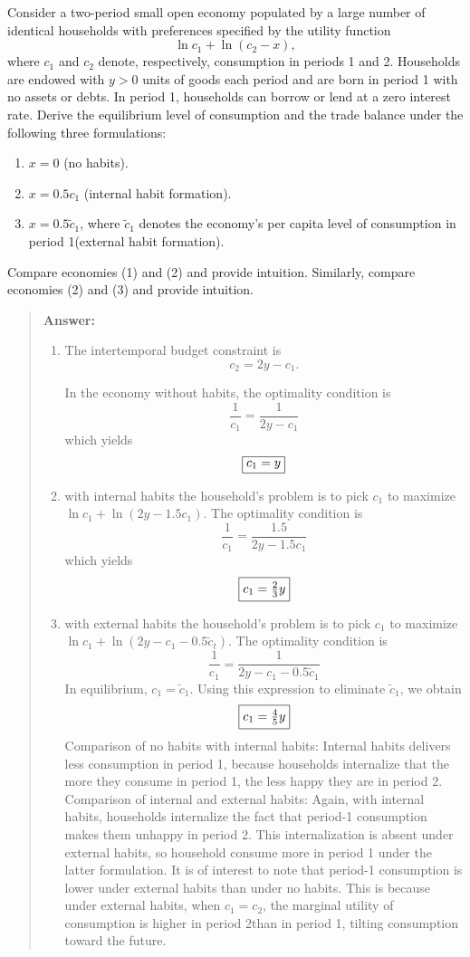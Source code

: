 \begin{exercise}
Consider a two-period small open economy populated by a large number of identical households with preferences specified by the utility function
\[\ln c_1 + \ln (c_2-x),\]
where $c_1$ and $c_2$ denote, respectively, consumption in periods 1 and 2. Households are endowed with $y>0$ units of goods each period and are born in period 1 with no assets or debts. In period 1, households can borrow or lend at a zero interest rate. Derive the equilibrium level of consumption and the trade balance under the following three formulations:
\begin{enumerate}
\item $x =0$ (no habits).
\item $x=0.5c_1$ (internal habit formation).
\item $x = 0.5\tilde{c}_1$, where $\tilde{c}_1$
denotes  the economy's per capita level of consumption  in period 1(external habit formation). 
\end{enumerate}
Compare economies (1) and (2) and provide intuition. Similarly,  compare economies (2) and (3) and provide intuition. 

\begin{quote}
{\bf Answer:}
\begin{enumerate}
\item 

 The intertemporal budget constraint is 
\[c_2 = 2y-c_1.\]


In the economy without habits, the optimality condition is 
\[
\frac 1 {c_1} = \frac 1 {2y-c_1}
\]
which yields
\[
\fbox{$c_1 = y$}
\]
\item with internal habits the household's problem is to pick $c_1$ to maximize 
$\ln c_1 + \ln (2y-1.5c_1)$. The optimality condition is
\[
\frac 1 {c_1} = \frac {1.5} {2y-1.5c_1}
\]
which yields
\[
\fbox{$c_1 = \frac 23y$}
\]
\item with external habits the household's problem is to pick $c_1$ to maximize 
$\ln c_1 + \ln (2y-c_1-0.5 \tilde{c}_t)$. The optimality condition is
\[
\frac 1 {c_1} = \frac {1} {2y-c_1-0.5\tilde{c}_1}
\]
In equilibrium, $c_1=\tilde{c}_1$. Using this expression to eliminate $\tilde{c}_1$, we obtain
\[
\fbox{$c_1 = \frac 45y$}
\]
Comparison of  no habits with internal habits: Internal habits delivers less consumption in period 1, because households internalize that the more they consume in period 1, the less happy they are in period 2. 
Comparison of internal and external habits: Again, with internal habits, households internalize the fact that period-1 consumption makes them unhappy in period 2. This internalization is absent under external habits, so household consume more in period 1 under the latter formulation. It is
of 
 interest to note that period-1 consumption is lower under external habits than under no habits. This is because under external habits,  when  $c_1=c_2$, the marginal utility of consumption is higher in period 2than in period 1, tilting consumption  toward the future. 
\end{enumerate}
\end{quote}
\end{exercise}


